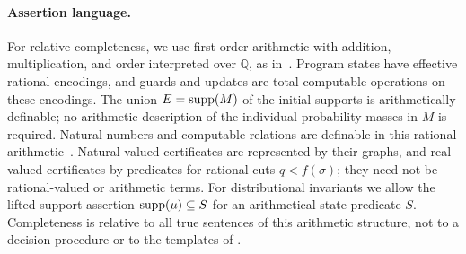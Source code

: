 \paragraph{Assertion language.}
For relative completeness, we use first-order arithmetic with addition,
multiplication, and order interpreted over $\mathbb Q$, as
in~\cite{DBLP:journals/pacmpl/MajumdarS25}. Program states have effective
rational encodings, and guards and updates are total computable operations
on these encodings. The union $E=\textnormal{supp}(M)$ of the initial supports is
arithmetically definable; no arithmetic description of the individual
probability masses in $M$ is required.
Natural numbers and computable relations are definable in this rational
arithmetic~\cite[Section~2.4]{DBLP:journals/pacmpl/MajumdarS25}.
Natural-valued certificates are represented by their graphs, and
real-valued certificates by predicates for rational cuts
$q<f(\sigma)$; they need not be rational-valued or arithmetic terms.
For distributional invariants we allow the lifted support assertion
$\textnormal{supp}(\mu)\subseteq S$ for an arithmetical state predicate $S$.
Completeness is relative to all true sentences of this arithmetic
structure, not to a decision procedure or to the templates of
.

